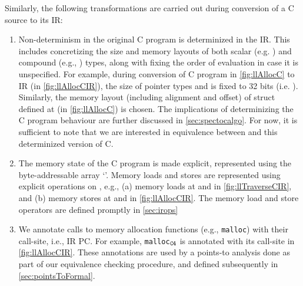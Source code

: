 Similarly, the following transformations are carried out during conversion of a C source to its IR:

\begin{enumerate}
\item Non-determinism in the original C program is determinized in the IR.
This includes concretizing the size and memory layouts of both scalar (e.g. )
and compound (e.g., ) types, along with fixing the order of evaluation in case
it is unspecified.
For example, during conversion of C program in \cref{fig:llAllocC} to IR (in \cref{fig:llAllocCIR}),
the size of pointer types and  is fixed to 32 bits (i.e. ).
Similarly, the memory layout (including alignment and offset) of  struct defined at  (in \cref{fig:llAllocC}) is chosen.
The implications of determinizing the C program behaviour are further discussed in \cref{sec:spectocalgo}.
For now, it is sufficient to note that we are interested in equivalence between \SpecL{} and this determinized version of C.
\item The memory state of the C program is made explicit, represented using the byte-addressable array `\mem{}'.
Memory loads and stores are represented using explicit operations on \mem{}, e.g.,
(a) memory loads at  and  in \cref{fig:llTraverseCIR}, and
(b) memory stores at  and  in \cref{fig:llAllocCIR}.
The memory load and store operators are defined promptly in \cref{sec:irops}
\item We annotate calls to memory allocation functions (e.g., {\tt malloc}) with their call-site, i.e., IR PC.
For example, {\tt malloc$_{{\tt C4}}$} is annotated with its call-site  in \cref{fig:llAllocCIR}.
These annotations are used by a points-to analysis done as part of our equivalence checking procedure,
and defined subsequently in \cref{sec:pointsToFormal}.
\end{enumerate}

